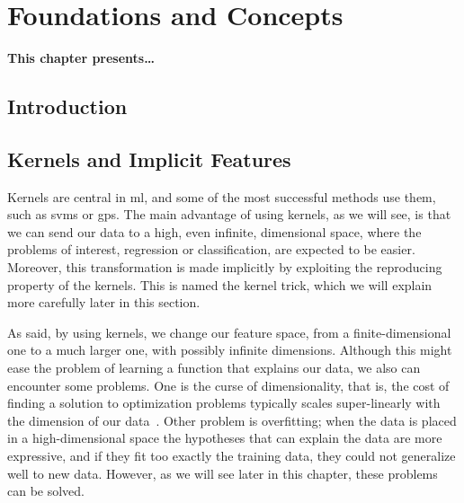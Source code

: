 
\chapter{Foundations and Concepts} %
\label{Chapter2}

{\bf \small{
This chapter presents\dots
}}


\section{Introduction}









\section{Kernels and Implicit Features}
Kernels are central in \acrshort{ml}, and some of the most successful methods use them, such as \acrshort{svms} or \acrshort{gps}.
The main advantage of using kernels, as we will see, is that we can send our data to a high, even infinite, dimensional space, where the problems of interest, regression or classification, are expected to be easier. Moreover, this transformation is made implicitly by exploiting the reproducing property of the kernels. This is named the kernel trick, which we will explain more carefully later in this section.

As said, by using kernels, we change our feature space, from a finite-dimensional one to a much larger one, with possibly infinite dimensions. Although this might ease the problem of learning a function that explains our data, we also can encounter some problems. One is the curse of dimensionality, that is, the cost of finding a solution to optimization problems typically scales super-linearly with the dimension of our data~\citep{Chapelle07}. Other problem is overfitting; when the data is placed in a high-dimensional space the hypotheses that can explain the data are more expressive, and if they fit too exactly the training data, they could not generalize well to new data. However, as we will see later in this chapter, these problems can be solved.


